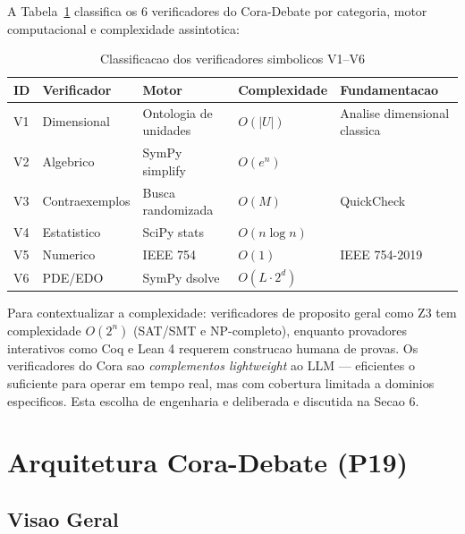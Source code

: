 \documentclass[5p]{elsarticle}
\begin{document}
A Tabela~\ref{tab:verifiers} classifica os 6 verificadores do Cora-Debate por categoria, motor computacional e complexidade assintotica:

\begin{table}[H]
  \centering
  \caption{Classificacao dos verificadores simbolicos V1--V6}
  \label{tab:verifiers}
  \begin{tabular}{lllll}
    \toprule
    \textbf{ID} & \textbf{Verificador} & \textbf{Motor} & \textbf{Complexidade} & \textbf{Fundamentacao} \\
    \midrule
    V1 & Dimensional & Ontologia de unidades & $O(|U|)$ & Analise dimensional classica \\
    V2 & Algebrico & SymPy simplify & $O(e^n)$ & \cite{meurer2017} \\
    V3 & Contraexemplos & Busca randomizada & $O(M)$ & QuickCheck \cite{claessen2000} \\
    V4 & Estatistico & SciPy stats & $O(n \log n)$ & \cite{virtanen2020} \\
    V5 & Numerico & IEEE 754 & $O(1)$ & IEEE 754-2019 \\
    V6 & PDE/EDO & SymPy dsolve & $O(L \cdot 2^d)$ & \cite{meurer2017} \\
    \bottomrule
  \end{tabular}
\end{table}

Para contextualizar a complexidade: verificadores de proposito geral como Z3 \cite{demoura2008} tem complexidade $O(2^n)$ (SAT/SMT e NP-completo), enquanto provadores interativos como Coq \cite{bertot2004} e Lean 4 \cite{demoura2021} requerem construcao humana de provas. Os verificadores do Cora sao \textit{complementos lightweight} ao LLM --- eficientes o suficiente para operar em tempo real, mas com cobertura limitada a dominios especificos. Esta escolha de engenharia e deliberada e discutida na Secao 6.

\section{Arquitetura Cora-Debate (P19)}

\subsection{Visao Geral}
\end{document}

